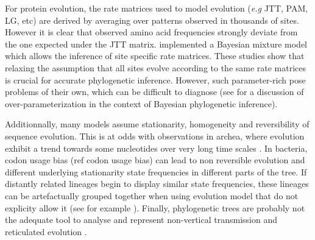 For protein evolution, the rate matrices used to model evolution (\emph{e.g} JTT, PAM, LG, etc) are derived by averaging over patterns observed in thousands of sites. However it is clear \citep{halpern1998evolutionary,parisi2001structural,susko2002testing} that observed amino acid frequencies strongly deviate from the one expected under the JTT matrix. \citet{lartillot2004bayesian} implemented a Bayesian mixture model which allows the inference of site specific rate matrices. These studies show that relaxing the assumption that all sites evolve according to the same rate matrices is crucial for accurate phylogenetic inference. However, such parameter-rich pose problems of their own, which can be difficult to diagnose (see \citet{rannala2002identifiability} for a  discussion of over-parameterization in the context of Bayesian phylogenetic inference).

Additionnally, many models  assume stationarity, homogeneity and reversibility of sequence evolution. This is at odds with observations in archea, where evolution exhibit a trend towards some nucleotides over very long time scales \citep{boussau2006efficient}. In bacteria, codon usage bias (ref codon usage bias) can lead to non reversible evolution and different underlying stationarity state frequencies in different parts of the tree. If distantly related lineages begin to display similar state frequencies, these lineages can be artefactually grouped together when using evolution model that do not explicity allow it (see for example \citep{foster2004modeling,jermiin2004biasing}). Finally, phylogenetic trees are probably not the adequate tool to analyse and represent non-vertical transmission and reticulated evolution \citep{huson2005application}.





